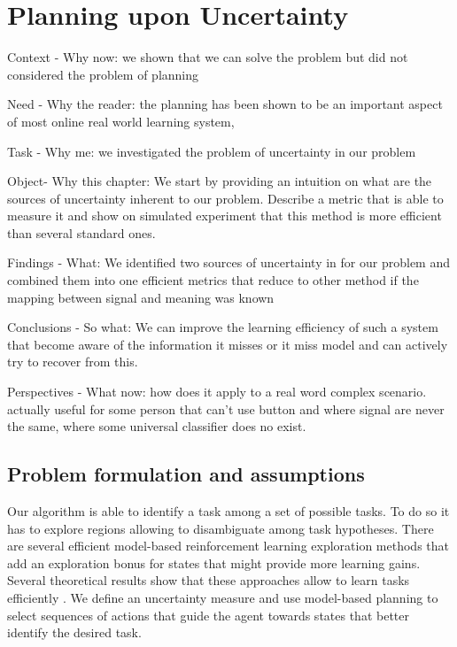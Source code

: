 \renewcommand{\chapterpath}{\allchapterspath/planning}
\renewcommand{\imgpath}{\chapterpath/img}

\chapter{Planning upon Uncertainty}
\label{chapter:planning}
\minitoc

Context - Why now: we shown that we can solve the problem but did not considered the problem of planning

Need - Why the reader: the planning has been shown to be an important aspect of most online real world learning system, 

Task - Why me: we investigated the problem of uncertainty in our problem

Object- Why this chapter: We start by providing an intuition on what are the sources of uncertainty inherent to our problem. Describe a metric that is able to measure it and show on simulated experiment that this method is more efficient than several standard ones.

Findings - What: We identified two sources of uncertainty in for our problem and combined them into one efficient metrics that reduce to other method if the mapping between signal and meaning was known

Conclusions - So what: We can improve the learning efficiency of such a system that become aware of the information it misses or it miss model and can actively try to recover from this.

Perspectives - What now: how does it apply to a real word complex scenario. actually useful for some person that can't use button and where signal are never the same, where some universal classifier does no exist.

\section{Problem formulation and assumptions}

Our algorithm is able to identify a task among a set of possible tasks. To do so it has to explore regions allowing to disambiguate among task hypotheses. There are several efficient model-based reinforcement learning exploration methods that add an exploration bonus for states that might provide more learning gains. Several theoretical results show that these approaches allow to learn tasks efficiently \cite{brafman2003r,kolter2009near}. We define an uncertainty measure and use model-based planning to select sequences of actions that guide the agent towards states that better identify the desired task.

